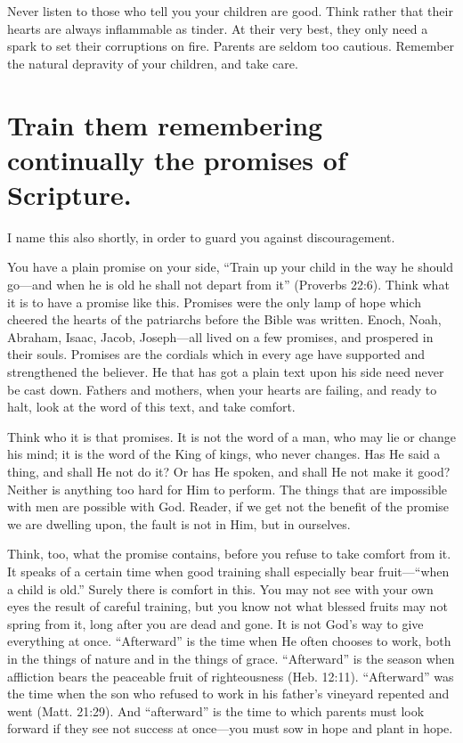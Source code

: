 \documentclass[
]{book}
\begin{document}
Never listen to those who tell you your children are good. Think rather that their hearts are always inflammable as tinder. At their very best, they only need a spark to set their corruptions on fire. Parents are seldom too cautious. Remember the natural depravity of your children, and take care.

\hypertarget{train-them-remembering-continually-the-promises-of-scripture.}{%
\chapter{Train them remembering continually the promises of Scripture.}\label{train-them-remembering-continually-the-promises-of-scripture.}}

I name this also shortly, in order to guard you against discouragement.

You have a plain promise on your side, ``Train up your child in the way he should go---and when he is old he shall not depart from it'' (Proverbs 22:6). Think what it is to have a promise like this. Promises were the only lamp of hope which cheered the hearts of the patriarchs before the Bible was written. Enoch, Noah, Abraham, Isaac, Jacob, Joseph---all lived on a few promises, and prospered in their souls. Promises are the cordials which in every age have supported and strengthened the believer. He that has got a plain text upon his side need never be cast down. Fathers and mothers, when your hearts are failing, and ready to halt, look at the word of this text, and take comfort.

Think who it is that promises. It is not the word of a man, who may lie or change his mind; it is the word of the King of kings, who never changes. Has He said a thing, and shall He not do it? Or has He spoken, and shall He not make it good? Neither is anything too hard for Him to perform. The things that are impossible with men are possible with God. Reader, if we get not the benefit of the promise we are dwelling upon, the fault is not in Him, but in ourselves.

Think, too, what the promise contains, before you refuse to take comfort from it. It speaks of a certain time when good training shall especially bear fruit---``when a child is old.'' Surely there is comfort in this. You may not see with your own eyes the result of careful training, but you know not what blessed fruits may not spring from it, long after you are dead and gone. It is not God's way to give everything at once. ``Afterward'' is the time when He often chooses to work, both in the things of nature and in the things of grace. ``Afterward'' is the season when affliction bears the peaceable fruit of righteousness (Heb. 12:11). ``Afterward'' was the time when the son who refused to work in his father's vineyard repented and went (Matt. 21:29). And ``afterward'' is the time to which parents must look forward if they see not success at once---you must sow in hope and plant in hope.
\end{document}
